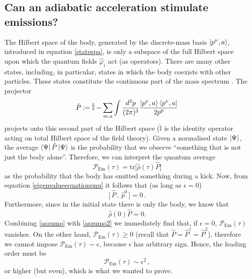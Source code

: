\documentclass[twocolumn,usenatbib]{mnras2}
\begin{document}
\subsection{Can an adiabatic acceleration stimulate emissions?}\label{emmizuz}

The Hilbert space of the body, generated by the discrete-mass basis $ \ket{p^\nu,a}$, introduced in equation \eqref{statespa}, is only a subspace of the full Hilbert space upon which the quantum fields $\hat{\varphi}_i$ act (as operators). There are many other states, including, in particular, states in which the body coexists with other particles. These states constitute the continuous part of the mass spectrum \citep{Peskin_book}. The projector
\begin{equation}
    \hat{P} := \hat{\mathbb{I}} - \sum_{m,a} \int \dfrac{d^3p}{(2\pi)^3} \dfrac{\ket{p^\nu ,a} \bra{p^\nu,a}}{2p^0} 
\end{equation}
projects onto this second part of the Hilbert space ($\hat{\mathbb{I}}$ is the identity operator acting on total Hilbert space of the field theory). Given a normalised state $\ket{\Psi}$, the average $\bra{\Psi} \hat{P} \ket{\Psi}$ is the probability that we observe ``something that is not just the body alone''. Therefore, we can interpret the quantum average
\begin{equation}
    \mathcal{P}_{\text{Em}}(\tau) = \text{tr} \bigg[ \hat{\rho}(\tau)  \hat{P} \bigg] 
\end{equation}
as the probability that the body has emitted something during a kick. Now, from equation \eqref{eigenvalueequationpnu} it follows that (as long as $\epsilon=0$)
\begin{equation}\label{aszumo}
     \Big[ \, \hat{P} \, , \, \hat{p}^0 \, \Big] =0 \, .
\end{equation}
Furthermore, since in the initial state there is only the body, we know that
\begin{equation}\label{aszumo2}
     \hat{\rho}(0) \hat{P} = 0.
\end{equation}
Combining \eqref{aszumo} with \eqref{aszumo2} we immediately find that, if $\epsilon=0$, $\mathcal{P}_{\text{Em}}(\tau)$ vanishes. On the other hand, $\mathcal{P}_{\text{Em}}(\tau) \geq 0$ (recall that $\hat{P}=\hat{P}^\dagger=\hat{P}^2$), therefore we cannot impose $\mathcal{P}_{\text{Em}}(\tau) \sim \epsilon$, because $\epsilon$ has arbitrary sign. Hence, the leading order must be
\begin{equation}
    \mathcal{P}_{\text{Em}}(\tau) \sim \epsilon^2 \, , 
\end{equation}
or higher (but even), which is what we wanted to prove. 









\end{document}
